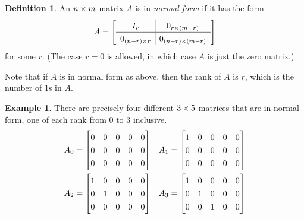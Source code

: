 \documentclass[reqno]{amsart}
\theoremstyle{definition}
\newtheorem{definition}[theorem]{Definition}
\newtheorem{example}[theorem]{Example}
\newcommand{\dfn}[1]{\emph{{#1}}\index{#1}}
\begin{document}
\begin{definition}\label{defn-normal-form}
 An $n\times m$ matrix $A$ is in \dfn{normal form} if it has the form
 \[ A = {\renewcommand{\arraystretch}{1.3}
     \left[\begin{array}{c|c}
      I_r & 0_{r\tm (m-r)} \\ \hline
      0_{(n-r)\tm r} & 0_{(n-r)\tm(m-r)}
     \end{array}\right]}
 \]
 for some $r$.  (The case $r=0$ is allowed, in which case $A$ is just
 the zero matrix.)
\end{definition}

Note that if $A$ is in normal form as above, then the rank of $A$ is
$r$, which is the number of $1$s in $A$.

\begin{example}\label{eg-normal-form}
 There are precisely four different $3\times 5$ matrices that are in
 normal form, one of each rank from $0$ to $3$ inclusive.
 \begin{align*}
  A_0 &= \bbm 0&0&0&0&0 \\ 0&0&0&0&0 \\ 0&0&0&0&0 \ebm &
  A_1 &= \bbm 1&0&0&0&0 \\ 0&0&0&0&0 \\ 0&0&0&0&0 \ebm \\
  A_2 &= \bbm 1&0&0&0&0 \\ 0&1&0&0&0 \\ 0&0&0&0&0 \ebm &
  A_3 &= \bbm 1&0&0&0&0 \\ 0&1&0&0&0 \\ 0&0&1&0&0 \ebm
 \end{align*}
\end{example}
\end{document}

